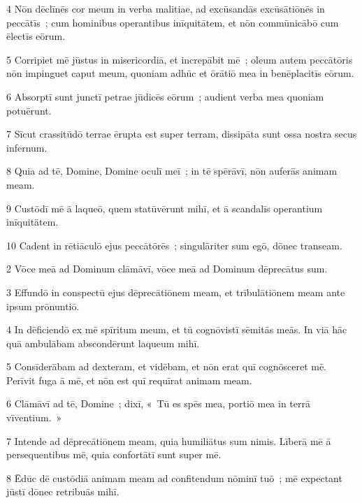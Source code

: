 \psalmVerse
  {\phantom{00}4}
  {Nōn dēclīnēs cor meum in verba malitiae, ad excūsandās excūsātiōnēs in peccātīs~; cum hominibus operantibus inīquitātem, et nōn commūnicābō cum ēlectīs eōrum.}


\psalmVerse
  {\phantom{00}5}
  {Corripiet mē jūstus in misericordiā, et increpābit mē~; oleum autem peccātōris nōn impinguet caput meum, quoniam adhūc et ōrātiō mea in benēplacitīs eōrum.}


\psalmVerse
  {\phantom{00}6}
  {Absorptī sunt junctī petrae jūdicēs eōrum~; audient verba mea quoniam potuērunt.}


\psalmVerse
  {\phantom{00}7}
  {Sīcut crassitūdō terrae ērupta est super terram, dissipāta sunt ossa nostra secus infernum.}


\psalmVerse
  {\phantom{00}8}
  {Quia ad tē, Domine, Domine oculī meī~; in tē spērāvī, nōn auferās animam meam.}


\psalmVerse
  {\phantom{00}9}
  {Custōdī mē ā laqueō, quem statūvērunt mihī, et ā scandalīs operantium inīquitātem.}


\psalmVerse
  {\phantom{0}10}
  {Cadent in rētiāculō ejus peccātōrēs~; singulāriter sum egō, dōnec transeam.}



\psalmVerse
  {\phantom{00}2}
  {Vōce meā ad Dominum clāmāvī, vōce meā ad Dominum dēprecātus sum.}


\psalmVerse
  {\phantom{00}3}
  {Effundō in conspectū ejus dēprecātiōnem meam, et trībulātiōnem meam ante ipsum prōnuntiō.}


\psalmVerse
  {\phantom{00}4}
  {In dēficiendō ex mē spīritum meum, et tū cognōvistī sēmitās meās. In viā hāc quā ambulābam abscondērunt laqueum mihī.}


\psalmVerse
  {\phantom{00}5}
  {Consīderābam ad dexteram, et vidēbam, et nōn erat quī cognōsceret mē. Perīvit fuga ā mē, et nōn est quī requīrat animam meam.}


\psalmVerse
  {\phantom{00}6}
  {Clāmāvī ad tē, Domine~; dixī, «~Tū es spēs mea, portiō mea in terrā vīventium.~»}


\psalmVerse
  {\phantom{00}7}
  {Intende ad dēprecātiōnem meam, quia humiliātus sum nimis. Līberā mē ā persequentibus mē, quia confortātī sunt super mē.}


\psalmVerse
  {\phantom{00}8}
  {Ēdūc dē custōdiā animam meam ad confitendum nōminī tuō~; mē expectant jūstī dōnec retribuās mihī.}


